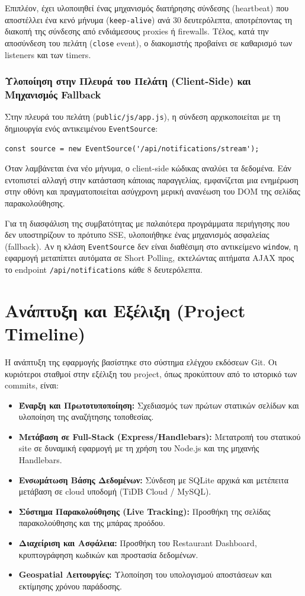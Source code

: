 \documentclass[acmsmall,screen,nonacm]{acmart}
\begin{document}
	Επιπλέον, έχει υλοποιηθεί ένας μηχανισμός διατήρησης σύνδεσης (heartbeat) που αποστέλλει ένα κενό μήνυμα (\texttt{keep-alive}) ανά 30 δευτερόλεπτα, αποτρέποντας τη διακοπή της σύνδεσης από ενδιάμεσους proxies ή firewalls. Τέλος, κατά την αποσύνδεση του πελάτη (\texttt{close} event), ο διακομιστής προβαίνει σε καθαρισμό των listeners και των timers.

	\subsubsection{Υλοποίηση στην Πλευρά του Πελάτη (Client-Side) και Μηχανισμός Fallback}
	Στην πλευρά του πελάτη (\texttt{public/js/app.js}), η σύνδεση αρχικοποιείται με τη δημιουργία ενός αντικειμένου \texttt{EventSource}:
	\begin{verbatim}
const source = new EventSource('/api/notifications/stream');
	\end{verbatim}
	Όταν λαμβάνεται ένα νέο μήνυμα, ο client-side κώδικας αναλύει τα δεδομένα. Εάν εντοπιστεί αλλαγή στην κατάσταση κάποιας παραγγελίας, εμφανίζεται μια ενημέρωση στην οθόνη και πραγματοποιείται ασύγχρονη μερική ανανέωση του DOM της σελίδας παρακολούθησης.
	
	Για τη διασφάλιση της συμβατότητας με παλαιότερα προγράμματα περιήγησης που δεν υποστηρίζουν το πρότυπο SSE, υλοποιήθηκε ένας μηχανισμός ασφαλείας (fallback). Αν η κλάση \texttt{EventSource} δεν είναι διαθέσιμη στο αντικείμενο \texttt{window}, η εφαρμογή μεταπίπτει αυτόματα σε Short Polling, εκτελώντας αιτήματα AJAX προς το endpoint \texttt{/api/notifications} κάθε 8 δευτερόλεπτα.

	\section{Ανάπτυξη και Εξέλιξη (Project Timeline)}
	Η ανάπτυξη της εφαρμογής βασίστηκε στο σύστημα ελέγχου εκδόσεων Git. Οι κυριότεροι σταθμοί στην εξέλιξη του project, όπως προκύπτουν από το ιστορικό των commits, είναι:
	\begin{itemize}
		\item \textbf{Έναρξη και Πρωτοτυποποίηση:} Σχεδιασμός των πρώτων στατικών σελίδων και υλοποίηση της αναζήτησης τοποθεσίας.
		\item \textbf{Μετάβαση σε Full-Stack (Express/Handlebars):} Μετατροπή του στατικού site σε δυναμική εφαρμογή με τη χρήση του Node.js και της μηχανής Handlebars.
		\item \textbf{Ενσωμάτωση Βάσης Δεδομένων:} Σύνδεση με SQLite αρχικά και μετέπειτα μετάβαση σε cloud υποδομή (TiDB Cloud / MySQL).
		\item \textbf{Σύστημα Παρακολούθησης (Live Tracking):} Προσθήκη της σελίδας παρακολούθησης και της μπάρας προόδου.
		\item \textbf{Διαχείριση και Ασφάλεια:} Προσθήκη του Restaurant Dashboard, κρυπτογράφηση κωδικών και προστασία δεδομένων.
		\item \textbf{Geospatial Λειτουργίες:} Υλοποίηση του υπολογισμού αποστάσεων και εκτίμησης χρόνου παράδοσης.
	\end{itemize}
	
\end{document}
